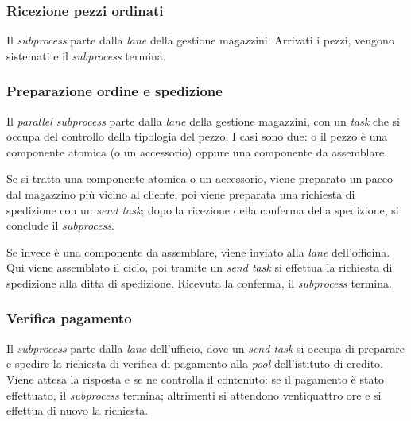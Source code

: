 \subsubsection{Ricezione pezzi ordinati}
Il \textit{subprocess} parte dalla \textit{lane} della gestione
magazzini. Arrivati i pezzi, vengono sistemati e il \textit{subprocess}
termina.
\subsubsection{Preparazione ordine e spedizione}
Il \textit{parallel subprocess} parte dalla \textit{lane} della gestione
magazzini, con un \textit{task} che si occupa del controllo della
tipologia del pezzo. I casi sono due: o il pezzo \`e una componente
atomica (o un accessorio) oppure una componente da assemblare.

Se si tratta una componente atomica o un accessorio, viene preparato un
pacco dal magazzino pi\`u vicino al cliente, poi viene preparata una
richiesta di spedizione con un \textit{send task}; dopo la ricezione
della conferma della spedizione, si conclude il \textit{subprocess}.

Se invece \`e una componente da assemblare, viene inviato alla
\textit{lane} dell'officina. Qui viene assemblato il ciclo, poi tramite
un \textit{send task} si effettua la richiesta di spedizione alla ditta
di spedizione. Ricevuta la conferma, il \textit{subprocess} termina.
\subsubsection{Verifica pagamento}
Il \textit{subprocess} parte dalla \textit{lane} dell'ufficio, dove un
\textit{send task} si occupa di preparare e spedire la richiesta di
verifica di pagamento alla \textit{pool} dell'istituto di credito. Viene
attesa la risposta e se ne controlla il contenuto: se il pagamento \`e
stato effettuato, il \textit{subprocess} termina; altrimenti si
attendono ventiquattro ore e si effettua di nuovo la richiesta.

